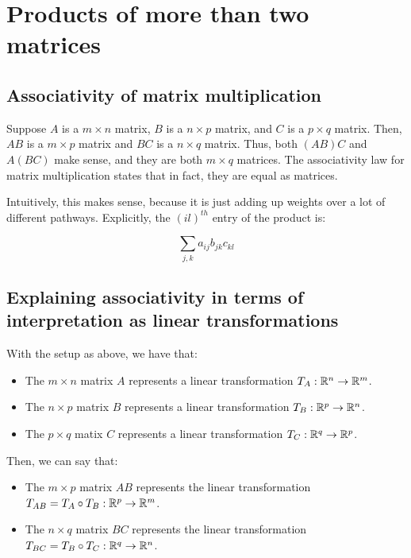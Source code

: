 \documentclass[10pt]{amsart}
\begin{document}
\section{Products of more than two matrices}

\subsection{Associativity of matrix multiplication}

Suppose $A$ is a $m \times n$ matrix, $B$ is a $n \times p$ matrix,
and $C$ is a $p \times q$ matrix. Then, $AB$ is a $m \times p$ matrix
and $BC$ is a $n \times q$ matrix. Thus, both $(AB)C$ and $A(BC)$ make sense,
and they are both $m \times q$ matrices. The associativity law for
matrix multiplication states that in fact, they are equal as matrices.

Intuitively, this makes sense, because it is just adding up weights
over a lot of different pathways. Explicitly, the $(il)^{th}$ entry of
the product is:

$$\sum_{j,k} a_{ij}b_{jk}c_{kl}$$

\subsection{Explaining associativity in terms of interpretation as linear transformations}

With the setup as above, we have that:

\begin{itemize}
\item The $m \times n$ matrix $A$ represents a linear transformation
  $T_A: \mathbb{R}^n \to \mathbb{R}^m$.
\item The $n \times p$ matrix $B$ represents a linear transformation
  $T_B: \mathbb{R}^p \to \mathbb{R}^n$.
\item The $p \times q$ matix $C$ represents a linear transformation
  $T_C: \mathbb{R}^q \to \mathbb{R}^p$.
\end{itemize}

Then, we can say that:

\begin{itemize}
\item The $m \times p$ matrix $AB$ represents the linear
  transformation $T_{AB} = T_A \circ T_B: \mathbb{R}^p \to \mathbb{R}^m$.
\item The $n \times q$ matrix $BC$ represents the linear
  transformation $T_{BC} = T_B \circ T_C: \mathbb{R}^q \to \mathbb{R}^n$.
\end{itemize}
\end{document}
